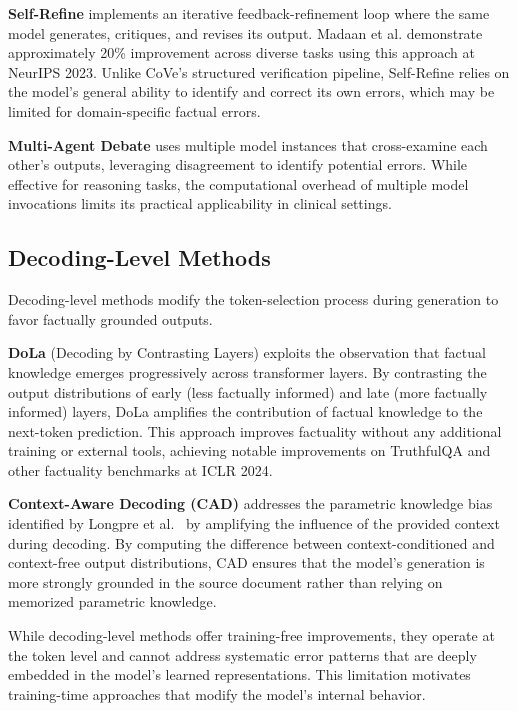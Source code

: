 \documentclass[12pt,a4paper,oneside]{report}
\begin{document}
\textbf{Self-Refine} \cite{madaan2023selfrefine} implements an iterative feedback-refinement loop where the same model generates, critiques, and revises its output. Madaan et al. demonstrate approximately 20\% improvement across diverse tasks using this approach at NeurIPS 2023. Unlike CoVe's structured verification pipeline, Self-Refine relies on the model's general ability to identify and correct its own errors, which may be limited for domain-specific factual errors.

\textbf{Multi-Agent Debate} \cite{du2024multiagent} uses multiple model instances that cross-examine each other's outputs, leveraging disagreement to identify potential errors. While effective for reasoning tasks, the computational overhead of multiple model invocations limits its practical applicability in clinical settings.

\subsection{Decoding-Level Methods}
\label{subsec:decoding-methods}

Decoding-level methods modify the token-selection process during generation to favor factually grounded outputs.

\textbf{DoLa} (Decoding by Contrasting Layers) \cite{chuang2024dola} exploits the observation that factual knowledge emerges progressively across transformer layers. By contrasting the output distributions of early (less factually informed) and late (more factually informed) layers, DoLa amplifies the contribution of factual knowledge to the next-token prediction. This approach improves factuality without any additional training or external tools, achieving notable improvements on TruthfulQA and other factuality benchmarks at ICLR 2024.

\textbf{Context-Aware Decoding (CAD)} \cite{shi2024cad} addresses the parametric knowledge bias identified by Longpre et al.~\cite{longpre2021entity} by amplifying the influence of the provided context during decoding. By computing the difference between context-conditioned and context-free output distributions, CAD ensures that the model's generation is more strongly grounded in the source document rather than relying on memorized parametric knowledge.

While decoding-level methods offer training-free improvements, they operate at the token level and cannot address systematic error patterns that are deeply embedded in the model's learned representations. This limitation motivates training-time approaches that modify the model's internal behavior.
\end{document}
